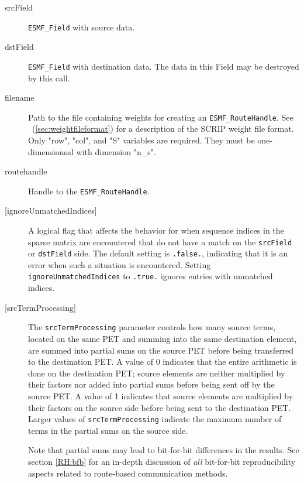    \begin{description}
  
   \item [srcField]
         {\tt ESMF\_Field} with source data.
  
   \item [dstField]
         {\tt ESMF\_Field} with destination data. The data in this Field may be
         destroyed by this call.
  
   \item [filename]
         Path to the file containing weights for creating an {\tt ESMF\_RouteHandle}.
         See ~(\ref{sec:weightfileformat}) for a description of the SCRIP weight
         file format. Only "row", "col", and "S" variables are required. They
         must be one-dimensionsal with dimension "n\_s".
  
   \item [routehandle]
         Handle to the {\tt ESMF\_RouteHandle}.
  
     \item [{[ignoreUnmatchedIndices]}]
       A logical flag that affects the behavior for when sequence indices
       in the sparse matrix are encountered that do not have a match on the
       {\tt srcField} or {\tt dstField} side. The default setting is
       {\tt .false.}, indicating that it is an error when such a situation is
       encountered. Setting {\tt ignoreUnmatchedIndices} to {\tt .true.} ignores
       entries with unmatched indices.
  
     \item [{[srcTermProcessing]}]
       The {\tt srcTermProcessing} parameter controls how many source terms,
       located on the same PET and summing into the same destination element,
       are summed into partial sums on the source PET before being transferred
       to the destination PET. A value of 0 indicates that the entire arithmetic
       is done on the destination PET; source elements are neither multiplied
       by their factors nor added into partial sums before being sent off by the
       source PET. A value of 1 indicates that source elements are multiplied
       by their factors on the source side before being sent to the destination
       PET. Larger values of {\tt srcTermProcessing} indicate the maximum number
       of terms in the partial sums on the source side.
  
       Note that partial sums may lead to bit-for-bit differences in the results.
       See section \ref{RH:bfb} for an in-depth discussion of {\em all}
       bit-for-bit reproducibility aspects related to route-based communication
       methods.
  

\end{description}
